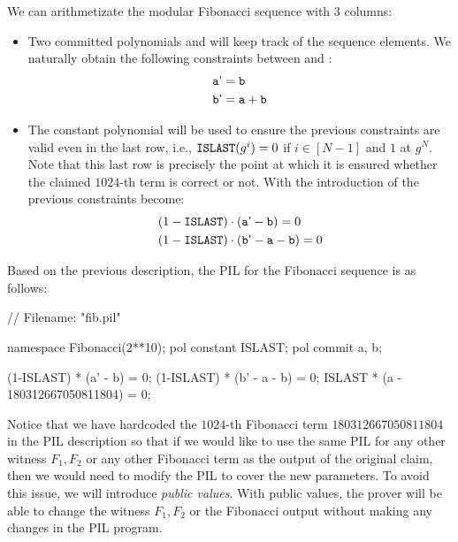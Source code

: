 We can arithmetizate the modular Fibonacci sequence with $3$ columns:
\begin{itemize}
    \item Two committed polynomials \att and \btt will keep track of the sequence elements. We naturally obtain the following constraints between \att and \btt:
    \begin{align*}
        &\mathtt{a}\textsf{'} = \mathtt{b} \\
        &\mathtt{b}\textsf{'} = \mathtt{a} + \mathtt{b}
    \end{align*}
    
    \item The constant polynomial \ISLAST will be used to ensure the previous constraints are valid even in the last row, i.e., $\mathtt{ISLAST}(g^i) = 0$ if $i\in[N-1]$ and $1$ at $g^N$. Note that this last row is precisely the point at which it is ensured whether the claimed $ 1024$-th term is correct or not. With the introduction of \ISLAST the previous constraints become:
    \begin{align*}
        &(1 - \mathtt{ISLAST}) \cdot (\mathtt{a}\textsf{'} - \mathtt{b}) = 0\\
        &(1 - \mathtt{ISLAST}) \cdot (\mathtt{b}\textsf{'} - \mathtt{a} - \mathtt{b}) = 0
    \end{align*}
\end{itemize}

Based on the previous description, the PIL for the Fibonacci sequence is as follows:
\begin{pil}
    // Filename: "fib.pil"
    
    namespace Fibonacci(2**10);
    pol constant ISLAST;   
    pol commit a, b;
    
    (1-ISLAST) * (a' - b) = 0;
    (1-ISLAST) * (b' - a - b) = 0;
    ISLAST * (a - 180312667050811804) = 0; 
\end{pil}
Notice that we have hardcoded the $1024$-th Fibonacci term $180312667050811804$ in the PIL description so that if we would like to use the same PIL for any other witness $F_1,F_2$ or any other Fibonacci term as the output of the original claim, then we would need to modify the PIL to cover the new parameters. To avoid this issue, we will introduce \textit{public values}. With public values, the prover will be able to change the witness $F_1,F_2$ or the Fibonacci output without making any changes in the PIL program.

